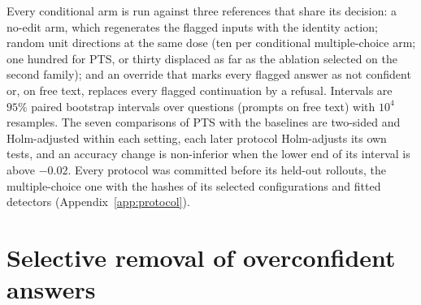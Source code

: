 \documentclass{article}
\begin{document}
Every conditional arm is run against three references that share its decision:
a no-edit arm, which regenerates the flagged inputs with the identity action;
random unit directions at the same dose (ten per conditional multiple-choice
arm; one hundred for PTS, or thirty displaced as far as the ablation selected
on the second family); and an override that marks every flagged answer as not
confident or, on free text, replaces every flagged continuation by a refusal.
Intervals are $95\%$ paired bootstrap intervals over questions (prompts on free
text) with $10^4$ resamples. The seven comparisons of PTS with the baselines
are two-sided and Holm-adjusted within each setting, each later protocol
Holm-adjusts its own tests, and an accuracy change is non-inferior when the
lower end of its interval is above $-0.02$. Every protocol was committed before
its held-out rollouts, the multiple-choice one with the hashes of its selected
configurations and fitted detectors (Appendix~\ref{app:protocol}).

\section{Selective removal of overconfident answers}
\label{sec:results}
\end{document}
